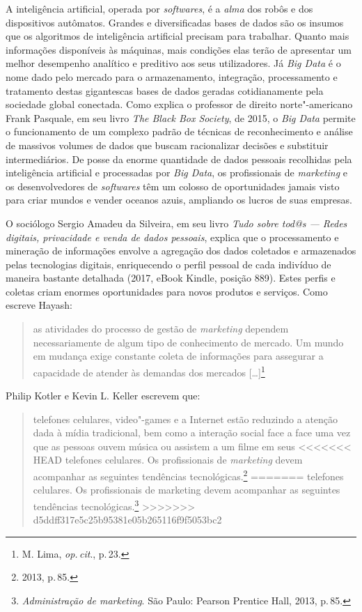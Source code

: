 A inteligência artificial, operada por \emph{softwares}, é a \emph{alma}
dos robôs e dos dispositivos autômatos. Grandes e diversificadas bases
de dados são os insumos que os algoritmos de inteligência artificial
precisam para trabalhar. Quanto mais informações disponíveis às
máquinas, mais condições elas terão de apresentar um melhor desempenho
analítico e preditivo aos seus utilizadores. Já \emph{Big Data} é o nome
dado pelo mercado para o armazenamento, integração, processamento e
tratamento destas gigantescas bases de dados geradas cotidianamente pela
sociedade global conectada. Como explica o professor de direito
norte"-americano Frank Pasquale, em seu livro \emph{The Black Box
Society}, de 2015, o \emph{Big Data} permite o funcionamento de um
complexo padrão de técnicas de reconhecimento e análise de massivos
volumes de dados que buscam racionalizar decisões e substituir
intermediários. De posse da enorme quantidade de dados pessoais
recolhidas pela inteligência artificial e processadas por \emph{Big
Data}, os profissionais de \textit{marketing} e os desenvolvedores de \emph{softwares}
têm um colosso de oportunidades jamais visto para criar mundos e vender
oceanos azuis, ampliando os lucros de suas empresas.

O sociólogo Sergio Amadeu da Silveira, em seu livro \emph{Tudo sobre tod@s --- Redes digitais, privacidade e venda
de dados pessoais}, explica que o processamento e mineração de
informações envolve a agregação dos dados coletados e armazenados pelas
tecnologias digitais, enriquecendo o perfil pessoal de cada indivíduo de
maneira bastante detalhada (2017, eBook Kindle, posição 889). Estes
perfis e coletas criam enormes oportunidades para novos produtos e
serviços. Como escreve Hayash:

\begin{quote}
as atividades do processo de gestão de \textit{marketing} dependem necessariamente de algum tipo de conhecimento de mercado. Um mundo em mudança exige constante coleta de
informações para assegurar a capacidade de atender às demandas dos
mercados {[}\ldots{}{]}\footnote{M. Lima, \emph{op.\,cit}., p.\,23.}
\end{quote}

Philip Kotler e Kevin L. Keller escrevem que:

\begin{quote}
telefones celulares, video"-games e a Internet estão reduzindo a
atenção dada à mídia tradicional, bem como a interação social face a
face uma vez que as pessoas ouvem música ou assistem a um filme em seus
<<<<<<< HEAD
telefones celulares. Os profissionais de \textit{marketing} devem acompanhar as
seguintes tendências tecnológicas.\footnote{2013, p.\,85.}
=======
telefones celulares. Os profissionais de marketing devem acompanhar as
seguintes tendências tecnológicas.\footnote{\emph{Administração de
marketing}. São Paulo: Pearson Prentice Hall, 2013, p.\,85.}
>>>>>>> d5ddff317e5c25b95381e05b265116f9f5053bc2
\end{quote}

